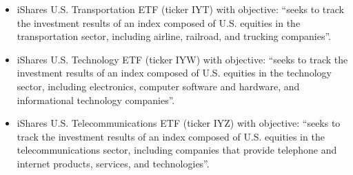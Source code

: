 \begin{enumerate}[label=(\alph*)]
\begin{itemize}
\item iShares U.S. Transportation ETF (ticker IYT) with objective: “seeks to track the investment results of an index composed of U.S. equities in the transportation sector, including airline, railroad, and trucking companies”.
\item iShares U.S. Technology ETF (ticker IYW) with objective: “seeks to track the investment results of an index composed of U.S. equities in the technology sector, including electronics, computer software and hardware, and informational technology companies”.
\item iShares U.S. Telecommunications ETF (ticker IYZ) with objective: “seeks to track the investment results of an index composed of U.S. equities in the telecommunications sector, including companies that provide telephone and internet products, services, and technologies”.
	\end{itemize}


\end{enumerate}
